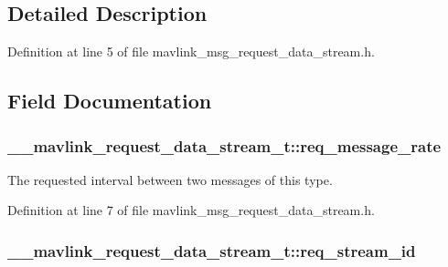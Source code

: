 \subsection{Detailed Description}


Definition at line 5 of file mavlink\-\_\-msg\-\_\-request\-\_\-data\-\_\-stream.\-h.



\subsection{Field Documentation}
\hypertarget{struct____mavlink__request__data__stream__t_a7be3844fa9c61b28b51dbd1fc452c1f0}{
\subsubsection[{req\-\_\-message\-\_\-rate}]{ \-\_\-\-\_\-mavlink\-\_\-request\-\_\-data\-\_\-stream\-\_\-t\-::req\-\_\-message\-\_\-rate}}\label{struct____mavlink__request__data__stream__t_a7be3844fa9c61b28b51dbd1fc452c1f0}


The requested interval between two messages of this type. 



Definition at line 7 of file mavlink\-\_\-msg\-\_\-request\-\_\-data\-\_\-stream.\-h.

\hypertarget{struct____mavlink__request__data__stream__t_af2333e886475f59842af3fd6ac61c08b}{
\subsubsection[{req\-\_\-stream\-\_\-id}]{ \-\_\-\-\_\-mavlink\-\_\-request\-\_\-data\-\_\-stream\-\_\-t\-::req\-\_\-stream\-\_\-id}}\label{struct____mavlink__request__data__stream__t_af2333e886475f59842af3fd6ac61c08b}


